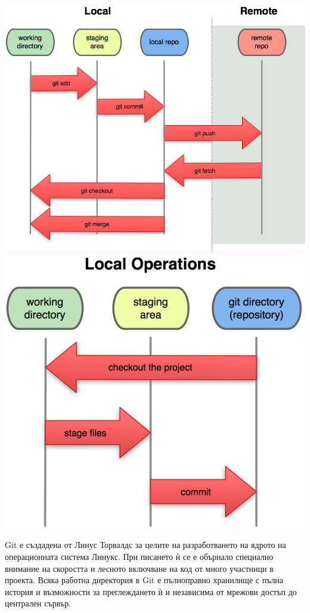 \documentclass[a4paper]{article}
\begin{document}
    \includegraphics[scale=1.0]{git_everthing_is_local.png}
    \includegraphics[scale=1.0]{git_local_ops.png}

    Git е създадена от Линус Торвалдс за целите на разработването на ядрото на операционната система Линукс. При писането ѝ се е обърнало специално внимание на скоростта и лесното включване на код от много участници в проекта. Всяка работна директория в Git е пълноправно хранилище с пълна история и възможности за преглеждането ѝ и независима от мрежови достъп до централен сървър.
  
\end{document}
